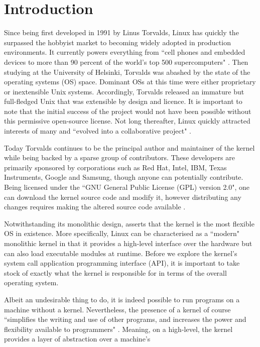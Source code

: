 \documentclass{article}
\begin{document}
\section{Introduction}
Since being first developed in 1991 by Linus Torvalds, Linux has quickly 
the surpassed the hobbyist market to becoming widely adopted in 
production environments. It currently powers everything from ``cell 
phones and embedded devices to more than 90 percent of the world's top 
500 supercomputers" \citep{Love7}. Then studying at the University of Helsinki,
Torvalds was abashed by the state of the operating systems (OS) space. Dominant 
OSs at this time were either proprietary or inextensible Unix systems. 
Accordingly, Torvalds released an immature but full-fledged Unix that was extensible
by design and licence. It is important to note that the initial success of the project 
would not have been possible without this permissive open-source license. 
Not long thereafter, Linux quickly attracted interests of many and ``evolved into a collaborative 
project" \citep{Love}.
\par
Today Torvalds continues to be the principal author and maintainer of the kernel while 
being backed by a sparse group of contributors. These developers are primarily 
sponsored by corporations such as Red Hat, Intel, IBM, Texas Instruments, Google
and Samsung, though anyone can potentially contribute. Being licensed under the
``GNU General Public License (GPL) version 2.0", one can download the kernel source
code and modify it, however distributing any changes requires making the altered source 
code available \citep{Love}. 
\par
Notwithstanding its monolithic design, \citet{Kroah} asserts that the kernel is the 
most flexible OS in existence. More specifically, Linux can be characterised 
as a ``modern" monolithic kernel in that it provides a high-level interface over the hardware
but can also load executable modules at runtime. Before we explore the kernel's
system call application programming interface (API), it is important to take stock
of exactly what the kernel is responsible for in terms of the overall operating system.
\par 
Albeit an undesirable thing to do, it is indeed possible 
to run programs on a machine without a kernel. Nevertheless, the
presence of a kernel  of course ``simplifies the writing and use of other programs,
and increases the power and flexibility available to programmers" \citep{Kerrisk}.
Meaning, on a high-level, the kernel provides a layer of abstraction over a machine's 
\end{document}

